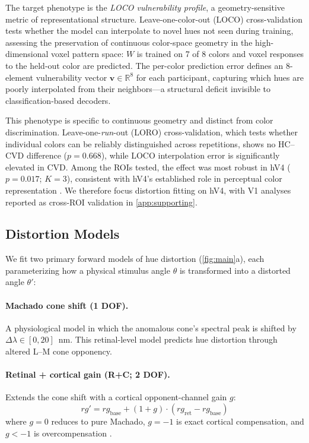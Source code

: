 \documentclass{article}
\begin{document}
The target phenotype is the \emph{LOCO vulnerability profile}, a geometry-sensitive metric of representational structure.
Leave-one-color-out (LOCO) cross-validation tests whether the model can interpolate to novel hues not seen during training, assessing the preservation of continuous color-space geometry in the high-dimensional voxel pattern space: $W$ is trained on 7 of 8 colors and voxel responses to the held-out color are predicted.
The per-color prediction error defines an 8-element vulnerability vector $\mathbf{v} \in \mathbb{R}^8$ for each participant, capturing which hues are poorly interpolated from their neighbors---a structural deficit invisible to classification-based decoders.

This phenotype is specific to continuous geometry and distinct from color discrimination.
Leave-one-\emph{run}-out (LORO) cross-validation, which tests whether individual colors can be reliably distinguished across repetitions, shows no HC--CVD difference ($p = 0.668$), while LOCO interpolation error is significantly elevated in CVD.
Among the ROIs tested, the effect was most robust in hV4 ($p = 0.017$; $K{=}3$), consistent with hV4's established role in perceptual color representation \citep{brouwer2009, bannert2018}.
We therefore focus distortion fitting on hV4, with V1 analyses reported as cross-ROI validation in \cref{app:supporting}.

\subsection{Distortion Models}

We fit two primary forward models of hue distortion (\cref{fig:main}a), each parameterizing how a physical stimulus angle $\theta$ is transformed into a distorted angle $\theta'$:

\paragraph{Machado cone shift (1 DOF).}
A physiological model \citep{machado2009} in which the anomalous cone's spectral peak is shifted by $\Delta\lambda \in [0, 20]$~nm.
This retinal-level model predicts hue distortion through altered L--M cone opponency.

\paragraph{Retinal + cortical gain (R+C; 2 DOF).}
Extends the cone shift with a cortical opponent-channel gain $g$:
\begin{equation}
rg' = rg_{\text{base}} + (1{+}g) \cdot (rg_{\text{ret}} - rg_{\text{base}})
\label{eq:rc}
\end{equation}
where $g{=}0$ reduces to pure Machado, $g{=}{-}1$ is exact cortical compensation, and $g{<}{-}1$ is overcompensation \citep{tregillus2021}.
\end{document}
